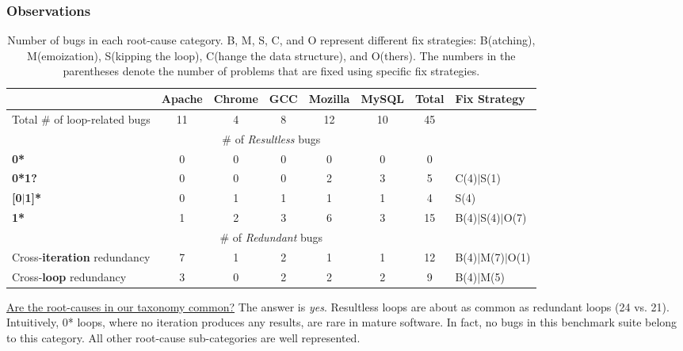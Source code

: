 \subsubsection{Observations}
\label{sec:study_ob}
\begin{table*}[tb!]
\begin{adjustwidth}{-.5in}{-.5in}
\scriptsize
\centering
{
\begin{tabular}{lccccccl}
\toprule
&Apache&Chrome&GCC&Mozilla&MySQL&Total&Fix Strategy\\
\midrule
Total \# of loop-related bugs & 11 & 4 & 8 & 12 & 10 & 45 &  \\
\midrule
\multicolumn{8}{c}{\# of {\textit {Resultless}} bugs}\\
\multicolumn{1}{l}{ {\bf 0*} }
&0&0&0&0&0&0&\\
\multicolumn{1}{l}{ {\bf 0*1?} }
&0&0&0&2&3&5&C(4)$|$S(1)\\
\multicolumn{1}{l}{{\bf [0$|$1]*}}
&0&1&1&1&1&4&S(4)\\
\multicolumn{1}{l}{{\bf 1*}}
&1&2&3&6&3&15& B(4)$|$S(4)$|$O(7)\\
\midrule
\multicolumn{8}{c}{ \# of {\textit {Redundant}} bugs}\\
\multicolumn{1}{l}{Cross-{\bf iteration} redundancy}
&7&1&2&1&1&12&B(4)$|$M(7)$|$O(1)\\
\multicolumn{1}{l}{ Cross-{\bf loop} redundancy}
&3&0&2&2&2&9&B(4)$|$M(5)\\
\bottomrule
\end{tabular}
}
\end{adjustwidth}
\caption{Number of bugs in each root-cause category. 
B, M, S, C, and O represent different fix strategies:
B(atching),  
M(emoization), 
S(kipping the loop),
C(hange the data structure), and O(thers). The numbers in the 
parentheses denote the number of problems that are fixed using specific
fix strategies.}
\label{tab:root}
\end{table*}



\underline{Are the root-causes in our taxonomy common?}
The answer is \textit{yes}.
Resultless loops are about as common as redundant loops
(24 vs. 21).
Intuitively, 0* loops, where no iteration produces any results,
are rare in mature software. In fact, no bugs in this
benchmark suite belong to this category.
All other root-cause sub-categories are well represented.



